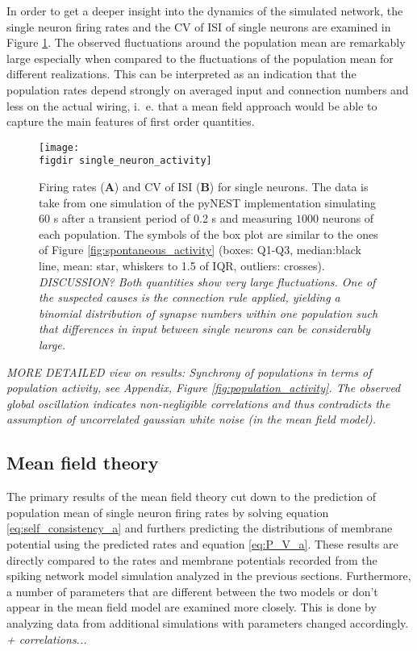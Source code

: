 In order to get a deeper insight into the dynamics of the simulated network, the single neuron firing 
rates and the CV of ISI of single neurons are examined in Figure \ref{fig:single_neuron_activity}.
The observed fluctuations around the population mean are remarkably large especially when compared 
to the fluctuations of the population mean for different realizations. This can be interpreted as 
an indication that the population rates depend strongly on averaged input and connection numbers
and less on the actual wiring, i.~e. that a mean field approach would be able to capture the main features 
of first order quantities. 
\begin{figure}[htpb]
    \centering
    \texttt{[image: \\figdir single\_neuron\_activity]}
    \caption{
        Firing rates (\textbf{A}) and CV of ISI (\textbf{B}) for single neurons. 
        The data is take from one simulation of the pyNEST implementation 
        simulating $60$ s after a transient period of 0.2 s and measuring 
        $1000$ neurons of each population. The symbols of the box plot 
        are similar to the ones of Figure \ref{fig:spontaneous_activity} 
        (boxes: Q1-Q3, median:black line, mean: star, 
        whiskers to 1.5 of IQR, outliers: crosses). 
        \emph{DISCUSSION?
        Both quantities show very large fluctuations. One of the suspected
        causes is the connection rule applied, yielding a binomial distribution 
        of synapse numbers within one population
        such that differences in input between single neurons can be 
    considerably large.}
    }
    \label{fig:single_neuron_activity}
\end{figure}


\emph{MORE DETAILED view on results:
Synchrony of populations in terms of population activity, 
see Appendix, Figure \ref{fig:population_activity}. 
The observed global oscillation indicates non-negligible correlations
and thus contradicts the assumption of uncorrelated gaussian white noise 
(in the mean field model).}

\subsection{Mean field theory}
The primary results of the mean field theory cut down to the prediction of 
population mean of single neuron firing rates by solving equation 
\eqref{eq:self_consistency_a} and furthers predicting the 
distributions of membrane potential using the predicted rates and 
equation \eqref{eq:P_V_a}. These results are directly compared to 
the rates and membrane potentials recorded from the spiking network 
model simulation analyzed in the previous sections. Furthermore, 
a number of parameters that are different between the two models 
or don't appear in the mean field model are examined more closely. 
This is done by analyzing data from additional simulations with 
parameters changed accordingly. 
\emph{+ correlations...}


